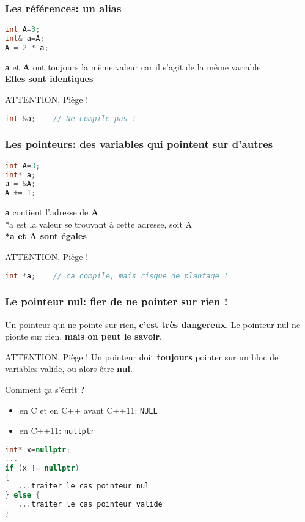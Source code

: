 \documentclass{beamer}
\begin{document}
\begin{frame}[fragile=singleslide,shrink=20]
\frametitle{Les références: un alias}

\begin{lstlisting}[language=c++]
int A=3;
int& a=A;
A = 2 * a;
\end{lstlisting}

\textbf{a} et \textbf{A} ont toujours la même valeur car il s'agit de la même variable. \\
\textbf{Elles sont identiques}

\begin{block}{ATTENTION, Piège !}
\begin{lstlisting}[language=c++]
int &a;    // Ne compile pas ! 
\end{lstlisting}
\end{block}
\end{frame}

\begin{frame}[fragile=singleslide,shrink=20]
\frametitle{Les pointeurs: des variables qui pointent sur d'autres}

\begin{lstlisting}[language=c++]
int A=3;
int* a;
a = &A;
A += 1;
\end{lstlisting}

\textbf{a} contient l'adresse de \textbf{A} \\
*a est la valeur se trouvant à cette adresse, soit A \\
\textbf{*a et A sont égales}

\begin{block}{ATTENTION, Piège !}
\begin{lstlisting}[language=c++]
int *a;    // ca compile, mais risque de plantage !
\end{lstlisting}
\end{block}
\end{frame}

\begin{frame}[fragile=singleslide,shrink=20]
\frametitle{Le pointeur nul: fier de ne pointer sur rien !}

Un pointeur qui ne pointe sur rien, \textbf{c'est très dangereux}.
Le pointeur nul ne pionte sur rien, \textbf{mais on peut le savoir}.

\begin{block}{ATTENTION, Piège !}
Un pointeur doit \textbf{toujours} pointer sur un bloc de variables valide, ou alors être \textbf{nul}.
\end{block}


Comment ça s'écrit ?
\begin{itemize}
\item{en C et en C++ avant C++11: \texttt{NULL}}
\item{en C++11: \texttt{nullptr}}
\end{itemize}

\begin{lstlisting}[language=c++]
int* x=nullptr;
...
if (x != nullptr)
{
   ...traiter le cas pointeur nul
} else {
   ...traiter le cas pointeur valide
}
\end{lstlisting}

\end{frame}
\end{document}

